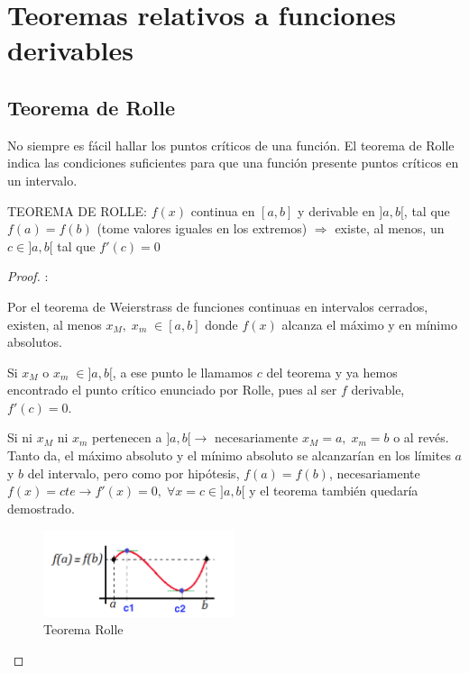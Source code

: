 \vspace{-5mm}

\section{Teoremas relativos a funciones derivables}

	
	\subsection{Teorema de Rolle}
	
	No siempre es fácil hallar los puntos críticos de una función. El teorema de Rolle indica las condiciones suficientes para que una función presente puntos críticos en un intervalo.
	
	
	\begin{teor} TEOREMA DE ROLLE: $f(x)$ continua en $[a,b]$ y derivable en $]a,b[$, tal que $f(a)=f(b)$  (tome valores iguales en los extremos) $\Rightarrow$ existe, al menos, un $c\in]a,b[$ tal que $f'(c)=0$
	\end{teor}
		

	\begin{proof}: 
	\begin{multicols}{2}
	
	Por el teorema de Weierstrass de funciones continuas en intervalos cerrados, existen, al menos $ x_M , \; x_m \; \in [a,b] $ donde $f(x)$  alcanza el máximo y en mínimo absolutos.
	
	Si $x_M$ o $x_m \; \in ]a,b[$, a ese punto le llamamos $c$ del teorema y ya hemos encontrado el punto crítico enunciado por Rolle, pues al ser $f$ derivable, $f'(c)=0$.
	
	Si ni $x_M$ ni $x_m$ pertenecen a $]a,b[\to $ necesariamente $x_M=a, \; x_m=b$ o al revés. Tanto da, el máximo absoluto y el mínimo absoluto se alcanzarían en los límites $a$ y $b$ del intervalo, pero como por hipótesis, $f(a)=f(b)$, necesariamente $f(x)=cte \to f'(x)=0, \; \forall x=c\in]a,b[$ y el teorema también quedaría demostrado. 
	
	\begin{figure}[H]
		\centering
		\includegraphics[width=0.5\textwidth]{imagenes/imagenes05/T05IM27.png}
		\caption {Teorema Rolle}	
	\end{figure}
	\end{multicols}
	\end{proof}
	
